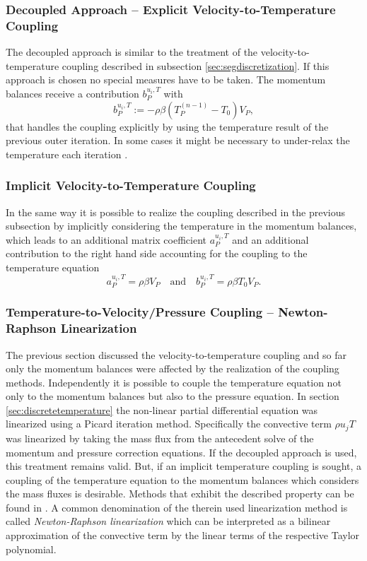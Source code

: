 \subsubsection{Decoupled Approach -- Explicit Velocity-to-Temperature Coupling}

The decoupled approach is similar to the treatment of the velocity-to-temperature coupling described in subsection \ref{sec:segdiscretization}. If this approach is chosen no special measures have to be taken. The momentum balances receive a contribution \( b_P^{u_i,T}\) with
\begin{displaymath}
  b_P^{u_i,T} := - \rho \beta \left( T_P^{(n-1)} - T_0 \right) V_P,
\end{displaymath}
that handles the coupling explicitly by using the temperature result of the previous outer iteration. In some cases it might be necessary to under-relax the temperature each iteration \cite{ferziger02}.

\subsubsection{Implicit Velocity-to-Temperature Coupling}

In the same way it is possible to realize the coupling described in the previous subsection by implicitly considering the temperature in the momentum balances, which leads to an additional matrix coefficient \(a_P^{u_i,T}\) and an additional contribution to the right hand side accounting for the coupling to the temperature equation
\begin{displaymath}
  a_P^{u_i,T} = \rho \beta V_P 
  \quad \text{and} \quad
  b_P^{u_i,T} = \rho \beta T_0 V_P.
\end{displaymath}

\subsubsection{Temperature-to-Velocity/Pressure Coupling -- Newton-Raphson Linearization}
\label{sec:nrcoupled}

The previous section discussed the velocity-to-temperature coupling and so far only the momentum balances were affected by the realization of the coupling methods. Independently it is possible to couple the temperature equation not only to the momentum balances but also to the pressure equation. In section \ref{sec:discretetemperature} the non-linear partial differential equation was linearized using a Picard iteration method. Specifically the convective term \(\rho u_j T\) was linearized by taking the mass flux from the antecedent solve of the momentum and pressure correction equations. If the decoupled approach is used, this treatment remains valid. But, if an implicit temperature coupling is sought, a coupling of the temperature equation to the momentum balances which considers the mass fluxes is desirable. Methods that exhibit the described property can be found in \cite{galpin86,oliveira01,sheu04,vakilipour12}. A common denomination of the therein used linearization method is called \emph{Newton-Raphson linearization} which can be interpreted as a bilinear approximation of the convective term by the linear terms of the respective Taylor polynomial.

